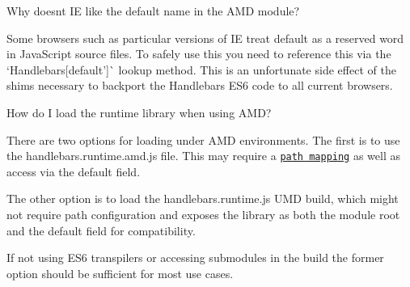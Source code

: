 \begin{DoxyEnumerate}
\item Why doesn\textquotesingle{}t IE like the {\ttfamily default} name in the A\+MD module?

Some browsers such as particular versions of IE treat {\ttfamily default} as a reserved word in Java\+Script source files. To safely use this you need to reference this via the `Handlebars\mbox{[}\textquotesingle{}default'\mbox{]}\`{} lookup method. This is an unfortunate side effect of the shims necessary to backport the Handlebars E\+S6 code to all current browsers.
\end{DoxyEnumerate}
\begin{DoxyEnumerate}
\item How do I load the runtime library when using A\+MD?

There are two options for loading under A\+MD environments. The first is to use the {\ttfamily handlebars.\+runtime.\+amd.\+js} file. This may require a \href{https://github.com/wycats/handlebars.js/blob/master/spec/amd-runtime.html#L31}{\tt path mapping} as well as access via the {\ttfamily default} field.

The other option is to load the {\ttfamily handlebars.\+runtime.\+js} U\+MD build, which might not require path configuration and exposes the library as both the module root and the {\ttfamily default} field for compatibility.

If not using E\+S6 transpilers or accessing submodules in the build the former option should be sufficient for most use cases. 
\end{DoxyEnumerate}